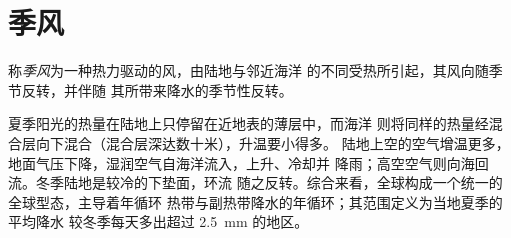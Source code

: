 \section{季风}\label{sec:b2:climate-variability:monsoons}

\begin{definition}[季风]\label{def:b2:climate-variability:monsoon}
称\emph{季风}为一种热力驱动的风，由陆地与邻近海洋
的不同受热所引起，其风向随季节反转，并伴随
其所带来降水的季节性反转。
\end{definition}

夏季阳光的热量在陆地上只停留在近地表的薄层中，而海洋
则将同样的热量经混合层向下混合（混合层深达数十米），升温要小得多。
陆地上空的空气增温更多，地面气压下降，湿润空气自海洋流入，上升、冷却并
降雨；高空空气则向海回流。冬季陆地是较冷的下垫面，环流
随之反转。综合来看，全球构成一个统一的全球型态，主导着年循环
热带与副热带降水的年循环；其范围定义为当地夏季的平均降水
较冬季每天多出超过 \qty{2.5}{mm} 的地区。

